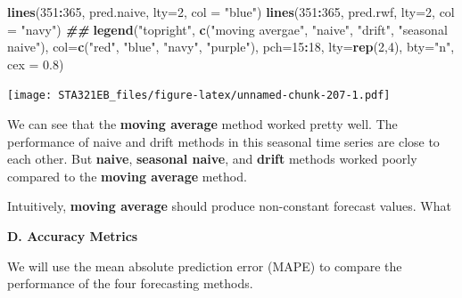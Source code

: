 \documentclass[
]{book}
\newenvironment{Shaded}{\begin{snugshade}}{\end{snugshade}}
\newcommand{\AttributeTok}[1]{\textcolor[rgb]{0.13,0.29,0.53}{#1}}
\newcommand{\DecValTok}[1]{\textcolor[rgb]{0.00,0.00,0.81}{#1}}
\newcommand{\DocumentationTok}[1]{\textcolor[rgb]{0.56,0.35,0.01}{\textbf{\textit{#1}}}}
\newcommand{\FloatTok}[1]{\textcolor[rgb]{0.00,0.00,0.81}{#1}}
\newcommand{\FunctionTok}[1]{\textcolor[rgb]{0.13,0.29,0.53}{\textbf{#1}}}
\newcommand{\NormalTok}[1]{#1}
\newcommand{\SpecialCharTok}[1]{\textcolor[rgb]{0.81,0.36,0.00}{\textbf{#1}}}
\newcommand{\StringTok}[1]{\textcolor[rgb]{0.31,0.60,0.02}{#1}}
\begin{document}
\begin{Shaded}
\begin{Highlighting}[]
\FunctionTok{lines}\NormalTok{(}\DecValTok{351}\SpecialCharTok{:}\DecValTok{365}\NormalTok{, pred.naive, }\AttributeTok{lty=}\DecValTok{2}\NormalTok{, }\AttributeTok{col =} \StringTok{"blue"}\NormalTok{)}
\FunctionTok{lines}\NormalTok{(}\DecValTok{351}\SpecialCharTok{:}\DecValTok{365}\NormalTok{, pred.rwf, }\AttributeTok{lty=}\DecValTok{2}\NormalTok{, }\AttributeTok{col =} \StringTok{"navy"}\NormalTok{)}
\DocumentationTok{\#\# }
\FunctionTok{legend}\NormalTok{(}\StringTok{"topright"}\NormalTok{, }\FunctionTok{c}\NormalTok{(}\StringTok{"moving avergae"}\NormalTok{, }\StringTok{"naive"}\NormalTok{, }\StringTok{"drift"}\NormalTok{, }\StringTok{"seasonal naive"}\NormalTok{),}
       \AttributeTok{col=}\FunctionTok{c}\NormalTok{(}\StringTok{"red"}\NormalTok{, }\StringTok{"blue"}\NormalTok{, }\StringTok{"navy"}\NormalTok{, }\StringTok{"purple"}\NormalTok{), }\AttributeTok{pch=}\DecValTok{15}\SpecialCharTok{:}\DecValTok{18}\NormalTok{, }\AttributeTok{lty=}\FunctionTok{rep}\NormalTok{(}\DecValTok{2}\NormalTok{,}\DecValTok{4}\NormalTok{),}
       \AttributeTok{bty=}\StringTok{"n"}\NormalTok{, }\AttributeTok{cex =} \FloatTok{0.8}\NormalTok{)}
\end{Highlighting}
\end{Shaded}

\texttt{[image: STA321EB\_files/figure-latex/unnamed-chunk-207-1.pdf]}

We can see that the \textbf{moving average} method worked pretty well. The performance of naive and drift methods in this seasonal time series are close to each other. But \textbf{naive}, \textbf{seasonal naive}, and \textbf{drift} methods worked poorly compared to the \textbf{moving average} method.

Intuitively, \textbf{moving average} should produce non-constant forecast values. What

\textbf{D. Accuracy Metrics}

We will use the mean absolute prediction error (MAPE) to compare the performance of the four forecasting methods.
\end{document}
